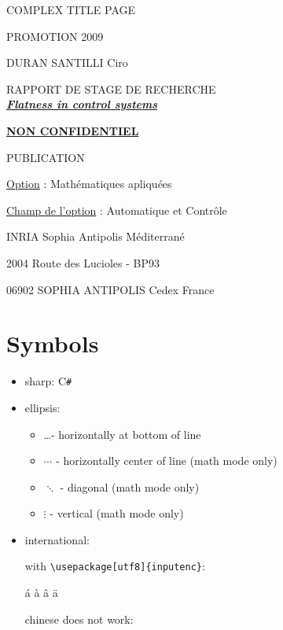 \documentclass[12pt]{article}
\begin{document}
\begin{titlepage}
COMPLEX TITLE PAGE

PROMOTION 2009

DURAN SANTILLI Ciro

\vspace{40 mm}

\begin{center}

{\large RAPPORT DE STAGE DE RECHERCHE}\\[0.5cm]

\underline{ \large \bfseries \itshape Flatness in control systems}

\vspace{10 mm}

\underline{ \bfseries NON CONFIDENTIEL }

PUBLICATION

\end{center}

\vspace{40 mm}

\underline{Option} : Mathématiques apliquées

\underline{Champ de l'option} : Automatique et Contrôle

\vspace{5 mm}

INRIA Sophia Antipolis Méditerrané

2004 Route des Lucioles - BP93

06902 SOPHIA ANTIPOLIS Cedex France
\end{titlepage}

\newpage

\begin{abstract}
\end{abstract}
\newpage

\section{Symbols}\label{symbols}

\begin{itemize}
  \item sharp: C\verb|#|
  
  \item ellipsis:
  \begin{itemize}
	  \item  \ldots - horizontally at bottom of line
	  \item  $\cdots$ - horizontally center of line (math mode only)
	  \item  $\ddots$ - diagonal (math mode only)
	  \item  $\vdots$ - vertical (math mode only)  
  \end{itemize}
  
  \item international:
  
    with \lstinline|\usepackage[utf8]{inputenc}|:
    
    á à â ä
    
    chinese does not work: %
  
\end{itemize}
\end{document}
